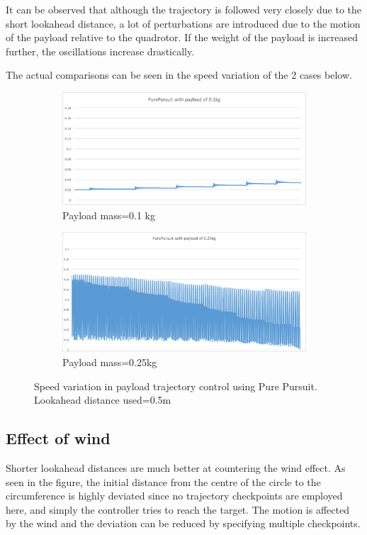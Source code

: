 \documentclass[hidelinks,BTech]{iitmdiss}
\begin{document}
It can be observed that although the trajectory is followed very closely due to the short lookahead distance, a lot of perturbations are introduced due to the motion of the payload relative to the quadrotor. If the weight of the payload is increased further, the oscillations increase drastically.

The actual comparisons can be seen in the speed variation of the 2 cases below.
\begin{figure}[H]
  \centering
  \begin{subfigure}[t]{0.48\textwidth}
    \centering
      \includegraphics[width=\textwidth]{Pure_Pursuit_speed_payload_0_1.png}
      \caption{Payload mass=0.1	kg}
  \end{subfigure}  \begin{subfigure}[t]{0.48\textwidth}
  \includegraphics[width=\textwidth]{Pure_Pursuit_speed_payload_0_25.png}
      \caption{Payload mass=0.25kg}
  \end{subfigure}
  \caption{Speed variation in payload trajectory control using Pure Pursuit. Lookahead distance used=0.5m}
\end{figure}	
\subsection*{Effect of wind}
Shorter lookahead distances are much better at countering the wind effect. As seen in the figure, the initial distance from the centre of the circle to the circumference is highly deviated since no trajectory checkpoints are employed here, and simply the controller tries to reach the target. The motion is affected by the wind and the deviation can be reduced by specifying multiple checkpoints. 
\end{document}

